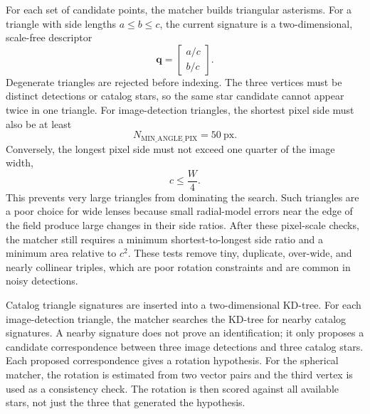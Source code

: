\documentclass[11pt]{article}
\begin{document}
For each set of candidate points, the matcher builds triangular asterisms. For
a triangle with side lengths \(a\le b\le c\), the current signature is a
two-dimensional, scale-free descriptor
\begin{equation}
  \mathbf{q} =
  \begin{bmatrix}
    a/c\\
    b/c
  \end{bmatrix}.
\end{equation}
Degenerate triangles are rejected before indexing. The three vertices must be
distinct detections or catalog stars, so the same star candidate cannot appear
twice in one triangle. For image-detection triangles, the shortest pixel side
must also be at least
\begin{equation}
  N_{\mathrm{MIN\_ANGLE\_PIX}} = 50 \ \mathrm{px}.
\end{equation}
Conversely, the longest pixel side must not exceed one quarter of the image
width,
\begin{equation}
  c \le \frac{W}{4}.
\end{equation}
This prevents very large triangles from dominating the search. Such triangles
are a poor choice for wide lenses because small radial-model errors near the
edge of the field produce large changes in their side ratios. After these
pixel-scale checks, the matcher still requires a minimum shortest-to-longest
side ratio and a minimum area relative to \(c^2\). These tests remove tiny,
duplicate, over-wide, and nearly collinear triples, which are poor rotation
constraints and are common in noisy detections.

Catalog triangle signatures are inserted into a two-dimensional KD-tree. For
each image-detection triangle, the matcher searches the KD-tree for nearby
catalog signatures. A nearby signature does not prove an identification; it
only proposes a candidate correspondence between three image detections and
three catalog stars. Each proposed correspondence gives a rotation hypothesis.
For the spherical matcher, the rotation is estimated from two vector pairs and
the third vertex is used as a consistency check. The rotation is then scored
against all available stars, not just the three that generated the hypothesis.
\end{document}
